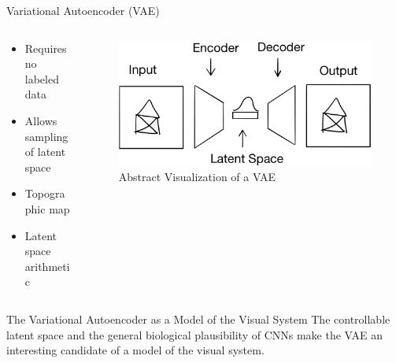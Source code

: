 \documentclass{beamer}
\begin{document}
    \begin{frame}{Variational Autoencoder (VAE)}
        \begin{columns}
            \begin{column}{0.48\textwidth}
                \begin{itemize}
                    \item Requires no labeled data
                    \item Allows sampling of latent space
                    \item Topographic map
                    \item Latent space arithmetic
                \end{itemize}
            \end{column}
            \begin{column}{0.48\textwidth}
                \begin{figure}
                    \centering
                    \includegraphics[width=\textwidth]{pres_imgs/vae_sketch.png}
                    \caption{Abstract Visualization of a VAE}
                    \label{fig:vae_sketch}
                \end{figure}
            \end{column}
        \end{columns}
    \end{frame}
    \begin{frame}{The Variational Autoencoder as a Model of the Visual System}
        The controllable latent space and the general biological plausibility of CNNs make the VAE an interesting candidate of a model of the visual system.
    \end{frame}
\end{document}
